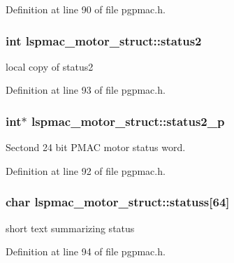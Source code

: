 Definition at line 90 of file pgpmac.\-h.

\hypertarget{structlspmac__motor__struct_a6a412224c09268c1dc92de9c2a1a2512}{
\subsubsection[{status2}]{\setlength{\rightskip}{0pt plus 5cm}int lspmac\-\_\-motor\-\_\-struct\-::status2}}\label{structlspmac__motor__struct_a6a412224c09268c1dc92de9c2a1a2512}


local copy of status2 



Definition at line 93 of file pgpmac.\-h.

\hypertarget{structlspmac__motor__struct_a2b33ef6e12717459c1e9967cc6e659c6}{
\subsubsection[{status2\-\_\-p}]{\setlength{\rightskip}{0pt plus 5cm}int$\ast$ lspmac\-\_\-motor\-\_\-struct\-::status2\-\_\-p}}\label{structlspmac__motor__struct_a2b33ef6e12717459c1e9967cc6e659c6}


Sectond 24 bit P\-M\-A\-C motor status word. 



Definition at line 92 of file pgpmac.\-h.

\hypertarget{structlspmac__motor__struct_ae4a6f54a98e7758d66228efebe8f3baa}{
\subsubsection[{statuss}]{\setlength{\rightskip}{0pt plus 5cm}char lspmac\-\_\-motor\-\_\-struct\-::statuss\mbox{[}64\mbox{]}}}\label{structlspmac__motor__struct_ae4a6f54a98e7758d66228efebe8f3baa}


short text summarizing status 



Definition at line 94 of file pgpmac.\-h.

